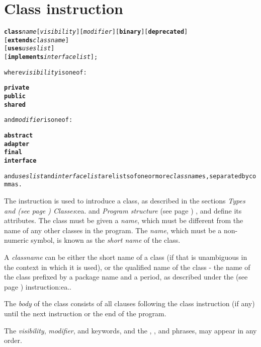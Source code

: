\chapter{Class instruction}\label{refclass}
\index{,}
\index{,}
\begin{shaded}
\begin{alltt}
\textbf{class} \emph{name} [\emph{visibility}] [\emph{modifier}] [\textbf{binary}] [\textbf{deprecated}]
               [\textbf{extends} \emph{classname}]
               [\textbf{uses} \emph{useslist}]
               [\textbf{implements} \emph{interfacelist}];

where \emph{visibility} is one of:

    \textbf{private}
    \textbf{public}
    \textbf{shared}

and \emph{modifier} is one of:

    \textbf{abstract}
    \textbf{adapter}
    \textbf{final}
    \textbf{interface}

and \emph{useslist} and \emph{interfacelist} are lists of one or more \emph{classname}s, separated by commas.
\end{alltt}
\end{shaded}
 The  instruction is used to introduce a class, as
described in the sections  \emph{Types and (see page \pageref{reftypes}) 
Classes}:ea. and  \emph{Program structure} (see page \pageref{refpstruct}) ,
and define its attributes.
The class must be given a \emph{name}, which must be different from
the name of any other classes in the program.
The \emph{name}, which must be a non-numeric symbol, is known as the
\emph{short name} of the class.
 
A \emph{classname} can be either the short name of a class (if that is
unambiguous in the context in which it is used), or the qualified name
of the class - the name of the class prefixed by a package name and
a period, as described under the   (see page \pageref{refpackage}) 
instruction:ea..
 
The \emph{body} of the class consists of all clauses following the
class instruction (if any) until the next  instruction or
the end of the program.
 
The \emph{visibility}, \emph{modifier}, and 
keywords, and the , , and
 phrases, may appear in any order.
